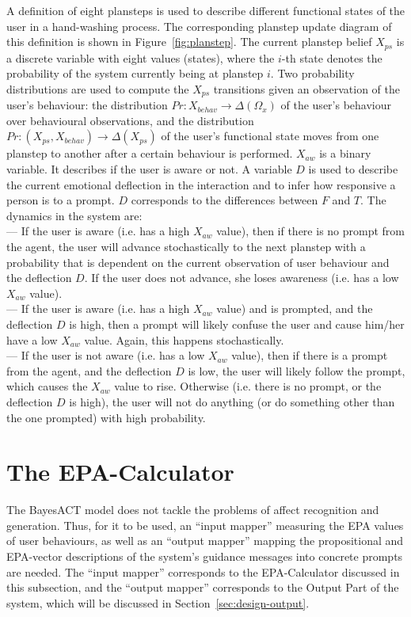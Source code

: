 A definition of eight plansteps is used to describe different functional states of the user in a hand-washing process. The corresponding planstep update diagram of this definition is shown in Figure~\ref{fig:planstep}. The current planstep belief $X_{ps}$ is a discrete variable with eight values (states), where the $i$-th state denotes the probability of the system currently being at planstep $i$. Two probability distributions are used to compute the $X_{ps}$ transitions given an observation of the user's behaviour: the distribution $Pr: X_{behav} \to \Delta(\Omega_{x})$ of the user's behaviour over behavioural observations, and the distribution $Pr: (X_{ps}, X_{behav}) \to \Delta(X_{ps})$ of the user's functional state moves from one planstep to another after a certain behaviour is performed. $X_{aw}$ is a binary variable. It describes if the user is aware or not. A variable $D$ is used to describe the current emotional deflection in the interaction and to infer how responsive a person is to a prompt. $D$ corresponds to the differences between $F$ and $T$. The dynamics in the system are: \\
--- If the user is aware (i.e. has a high $X_{aw}$ value), then if there is no prompt from the agent, the user will advance stochastically to the next planstep with a probability that is dependent on the current observation of user behaviour and the deflection $D$. If the user does not advance, she loses awareness (i.e. has a low $X_{aw}$ value). \\
--- If the user is aware (i.e. has a high $X_{aw}$ value) and is prompted, and the deflection $D$ is high, then a prompt will likely confuse the user and cause him/her have a low $X_{aw}$ value. Again, this happens stochastically. \\
--- If the user is not aware (i.e. has a low $X_{aw}$ value), then if there is a prompt from the agent, and the deflection $D$ is low, the user will likely follow the prompt, which causes the $X_{aw}$ value to rise. Otherwise (i.e. there is no prompt, or the deflection $D$ is high), the user will not do anything (or do something other than the one prompted) with high probability.


\section{The EPA-Calculator}
\label{sec:design-epacalc}

The BayesACT model does not tackle the problems of affect recognition and generation. Thus, for it to be used, an ``input mapper'' measuring the EPA values of user behaviours, as well as an ``output mapper'' mapping the propositional and EPA-vector descriptions of the system's guidance messages into concrete prompts are needed. The ``input mapper'' corresponds to the EPA-Calculator discussed in this subsection, and the ``output mapper'' corresponds to the Output Part of the system, which will be discussed in Section~\ref{sec:design-output}.

